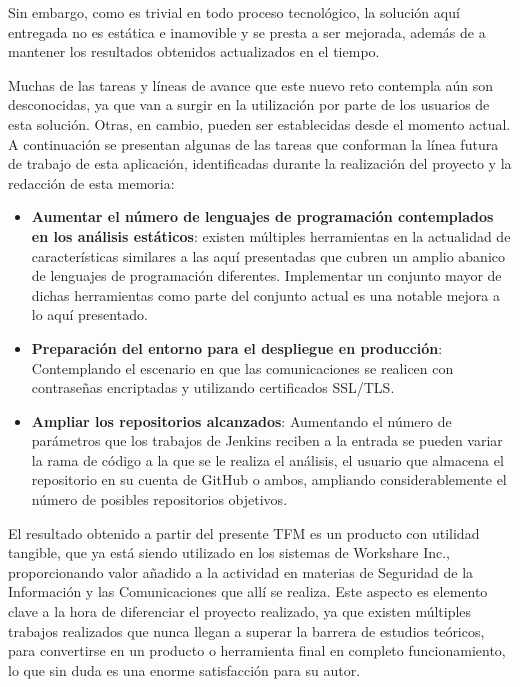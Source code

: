 Sin embargo, como es trivial en todo proceso tecnológico, la solución aquí entregada no es estática e inamovible y se presta a ser mejorada, además de a mantener los resultados obtenidos actualizados en el tiempo.

Muchas de las tareas y líneas de avance que este nuevo reto contempla aún son desconocidas, ya que van a surgir en la utilización por parte de los usuarios de esta solución. Otras, en cambio, pueden ser establecidas desde el momento actual. A continuación se presentan algunas de las tareas que conforman la línea futura de trabajo de esta aplicación, identificadas durante la realización del proyecto y la redacción de esta memoria:

\begin{itemize}
	\item \textbf{Aumentar el número de lenguajes de programación contemplados en los análisis estáticos}: existen múltiples herramientas en la actualidad de características similares a las aquí presentadas que cubren un amplio abanico de lenguajes de programación diferentes. Implementar un conjunto mayor de dichas herramientas como parte del conjunto actual es una notable mejora a lo aquí presentado.
	\item \textbf{Preparación del entorno para el despliegue en producción}: Contemplando el escenario en que las comunicaciones se realicen con contraseñas encriptadas y utilizando certificados SSL/TLS.
	\item \textbf{Ampliar los repositorios alcanzados}: Aumentando el número de parámetros que los trabajos de Jenkins reciben a la entrada se pueden variar la rama de código a la que se le realiza el análisis, el usuario que almacena el repositorio en su cuenta de GitHub o ambos, ampliando considerablemente el número de posibles repositorios objetivos.  
\end{itemize}

El resultado obtenido a partir del presente \gls{TFM} es un producto con utilidad tangible, que ya está siendo utilizado en los sistemas de Workshare Inc., proporcionando valor añadido a la actividad en materias de Seguridad de la Información y las Comunicaciones que allí se realiza. Este aspecto es elemento clave a la hora de diferenciar el proyecto realizado, ya que existen múltiples trabajos realizados que nunca llegan a superar la barrera de estudios teóricos, para convertirse en un producto o herramienta final en completo funcionamiento, lo que sin duda es una enorme satisfacción para su autor.

\endinput
